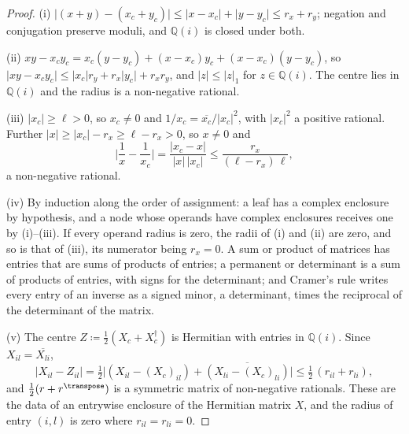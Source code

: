 \begin{proof}
(i) $\lvert(x+y)-(x_c+y_c)\rvert\le\lvert x-x_c\rvert+\lvert y-y_c\rvert
\le r_x+r_y$; negation and conjugation preserve moduli, and
$\mathbb{Q}(i)$ is closed under both.

(ii) $xy-x_cy_c=x_c(y-y_c)+(x-x_c)y_c+(x-x_c)(y-y_c)$, so
$\lvert xy-x_cy_c\rvert\le\lvert x_c\rvert r_y+r_x\lvert y_c\rvert+r_xr_y$,
and $\lvert z\rvert\le\lvert z\rvert_{1}$ for $z\in\mathbb{Q}(i)$. The centre
lies in $\mathbb{Q}(i)$ and the radius is a non-negative rational.

(iii) $\lvert x_c\rvert\ge\ell>0$, so $x_c\neq0$ and
$1/x_c=\overline{x_c}/\lvert x_c\rvert^{2}$, with $\lvert x_c\rvert^{2}$ a
positive rational. Further $\lvert x\rvert\ge\lvert x_c\rvert-r_x\ge\ell-r_x>0$,
so $x\neq0$ and
\begin{equation*}
  \Big\lvert\frac1x-\frac1{x_c}\Big\rvert
  =\frac{\lvert x_c-x\rvert}{\lvert x\rvert\,\lvert x_c\rvert}
  \le\frac{r_x}{(\ell-r_x)\,\ell} ,
\end{equation*}
a non-negative rational.

(iv) By induction along the order of assignment: a leaf has a complex
enclosure by hypothesis, and a node whose operands have complex enclosures
receives one by (i)--(iii). If every operand radius is zero, the radii of (i)
and (ii) are zero, and so is that of (iii), its numerator being $r_x=0$. A
sum or product of matrices has entries that are sums of products of entries; a
permanent or determinant is a sum of products of entries, with signs for the
determinant; and Cramer's rule writes every entry of an inverse as a signed
minor, a determinant, times the reciprocal of the determinant of the matrix.

(v) The centre
$Z\coloneqq\tfrac12(X_c+X_c^{\dagger})$ is Hermitian with entries in
$\mathbb{Q}(i)$. Since $X_{il}=\overline{X_{li}}$,
\begin{equation*}
  \lvert X_{il}-Z_{il}\rvert
  =\tfrac12\big\lvert(X_{il}-(X_c)_{il})
     +\overline{(X_{li}-(X_c)_{li})}\big\rvert
  \le\tfrac12\,(r_{il}+r_{li}) ,
\end{equation*}
and $\tfrac12(r+r^{\transpose})$ is a symmetric matrix of non-negative
rationals. These are
the data of an entrywise enclosure of the Hermitian matrix $X$, and the radius
of entry $(i,l)$ is zero where $r_{il}=r_{li}=0$.
\end{proof}
